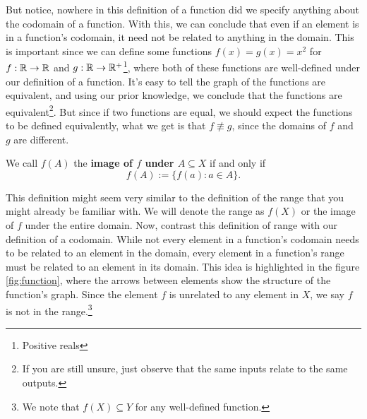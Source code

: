 But notice, nowhere in this definition of a function did we specify anything about the codomain of a function. 
With this, we can conclude that even if an element is in a function's codomain, it need not be related to anything in the domain.
This is important since we can define some functions $f(x)=g(x)=x^2$ for $f:\mathbb{R}\to\mathbb{R}$ and $g:\mathbb{R}\to\mathbb{R}^+$\footnote{Positive reals}, where both of these functions are well-defined under our definition of a function.
It's easy to tell the graph of the functions are equivalent, and using our prior knowledge, we conclude that the functions are equivalent\footnote{
If you are still unsure, just observe that the same inputs relate to the same outputs.}.
But since if two functions are equal, we should expect the functions to be defined equivalently, what we get is that $f\not\equiv g$, since the domains of $f$ and $g$ are different.

\begin{define}
	We call $f(A)$ the \textbf{image of $f$ under $A\subseteq X$}  if and only if
	$$f(A):=\{f(a) : a\in A\}.$$
\end{define}

This definition might seem very similar to the definition of the range that you might already be familiar with.
We will denote the range as $f(X)$ or the image of $f$ under the entire domain.
Now, contrast this definition of range with our definition of a codomain.
While not every element in a function's codomain needs to be related to an element in the domain, every element in a function's range must be related to an element in its domain.
This idea is highlighted in the figure \eqref{fig:function}, where the arrows between elements show the structure of the function's graph.
Since the element $f$ is unrelated to any element in $X$, we say $f$ is not in the range.\footnote{We note that $f(X)\subseteq Y$ for any well-defined function.}

\begin{figure}[h]
\centering
{}
	\caption{}
	\label{fig:function}
\end{figure}

